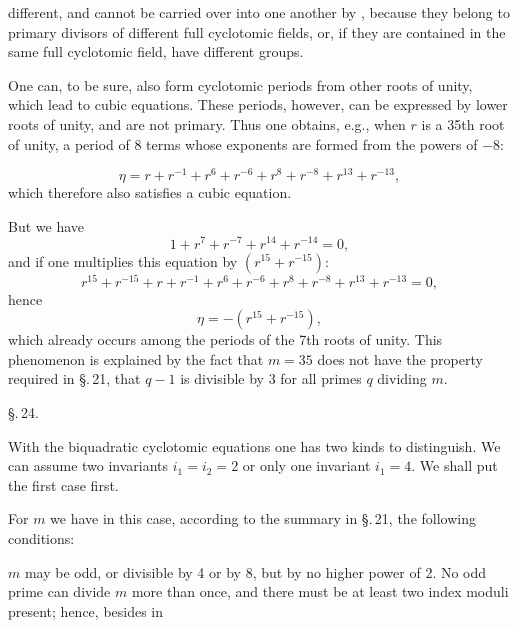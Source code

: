 different, and cannot be carried over into one another by , because they belong to primary divisors of different full cyclotomic fields, or, if they are contained in the same full cyclotomic field, have different groups.

One can, to be sure, also form cyclotomic periods from other roots of unity, which lead to cubic equations. These periods, however, can be expressed by lower roots of unity, and are not primary. Thus one obtains, e.g., when $r$ is a 35th root of unity, a period of 8 terms whose exponents are formed from the powers of $-8$:

\[
\eta = r + r^{-1} + r^6 + r^{-6} + r^8 + r^{-8} + r^{13} + r^{-13},
\]
which therefore also satisfies a cubic equation.

But we have
\[
1 + r^7 + r^{-7} + r^{14} + r^{-14} = 0,
\]
and if one multiplies this equation by $(r^{15} + r^{-15})$:
\[
r^{15} + r^{-15} + r + r^{-1} + r^6 + r^{-6} + r^8 + r^{-8} + r^{13} + r^{-13} = 0,
\]
hence
\[
\eta = -(r^{15} + r^{-15}),
\]
which already occurs among the periods of the 7th roots of unity. This phenomenon is explained by the fact that $m = 35$ does not have the property required in \S.\,21, that $q - 1$ is divisible by 3 for all primes $q$ dividing $m$.

\begin{center}
\S.\,24.

\end{center}

With the biquadratic cyclotomic equations one has two kinds to distinguish. We can assume two invariants $i_1 = i_2 = 2$ or only one invariant $i_1 = 4$. We shall put the first case first.

For $m$ we have in this case, according to the summary in \S.\,21, the following conditions:

$m$ may be odd, or divisible by 4 or by 8, but by no higher power of 2. No odd prime can divide $m$ more than once, and there must be at least two index moduli present; hence, besides in
